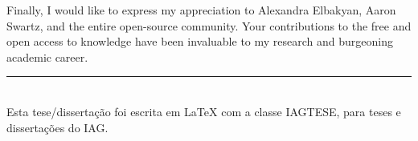 Finally, I would like to express my appreciation to Alexandra Elbakyan, Aaron Swartz, and the entire open-source community. Your contributions to the free and open access to knowledge have been invaluable to my research and burgeoning academic career.

\vfill

\begin{flushleft}
\rule{6cm}{0.5pt}\\
{\footnotesize{Esta tese/dissertação foi escrita em \LaTeX{} com a classe IAGTESE, para teses e dissertações do IAG.}}
\end{flushleft}